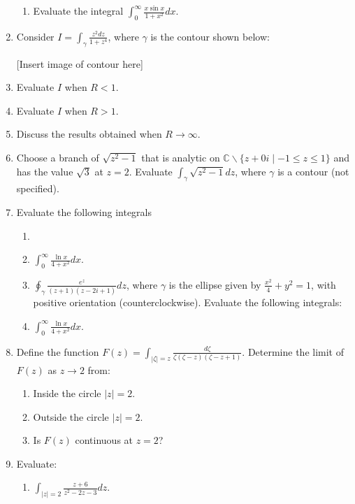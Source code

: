 \documentclass[a4paper,10pt]{article}
\begin{document}
\begin{enumerate}
\begin{enumerate}
	\item Evaluate the integral $\int_{0}^{\infty}\frac{x \sin x}{1+x^{2}}dx$.
	\end{enumerate}
	
\item
	Consider $I = \int_{\gamma}\frac{z^{2}dz}{1+z^{4}}$, where $\gamma$ is the contour shown below:
	
	[Insert image of contour here]
	
	\item Evaluate $I$ when $R < 1$.
	\item  Evaluate $I$ when $R > 1$.
	\item  Discuss the results obtained when $R \rightarrow \infty$.
	
\item 
	Choose a branch of $\sqrt{z^{2}-1}$ that is analytic on $\mathbb{C} \backslash \{z + 0i \mid -1 \leq z \leq 1\}$ and has the value $\sqrt{3}$ at $z = 2$. Evaluate $\int_{\gamma}\sqrt{z^{2}-1}dz$, where $\gamma$ is a contour (not specified).
	
\item Evaluate the following integrals
\begin{enumerate}
	\item \item  $\int_{0}^{\infty}\frac{\ln x}{4+x^{2}}dx$.
	\item  $\oint_{\gamma}\frac{e^{z}}{(z+1)(z-2i+1)}dz$, where $\gamma$ is the ellipse given by $\frac{x^{2}}{4} + y^{2} = 1$, with positive orientation (counterclockwise).
	Evaluate the following integrals:
	\item $\int_{0}^{\infty}\frac{\ln x}{4+x^{2}}dx$.
\end{enumerate}
		
\item 
	Define the function $F(z) = \int_{|\zeta| = z}\frac{d\zeta}{\zeta(\zeta-z)(\zeta-z+1)}$. Determine the limit of $F(z)$ as $z \rightarrow 2$ from:
	
\begin{enumerate}
	\item Inside the circle $|z| = 2$.
	\item Outside the circle $|z| = 2$.
	\item Is $F(z)$ continuous at $z = 2$?
\end{enumerate}
	

\item 
	
	Evaluate:
	
	\begin{enumerate}
	\item $\int_{|z|=2}\frac{z+6}{z^{2}-2z-3}dz$.
	

\end{enumerate}
\end{enumerate}
\end{document}
